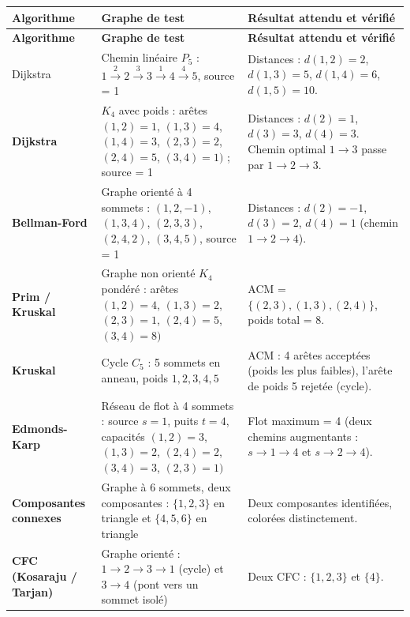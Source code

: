 \documentclass[a4paper,12pt]{report}
\begin{document}
\renewcommand{\arraystretch}{1.3}
\begin{longtable}{>{\bfseries}p{3.2cm} p{4.8cm} p{5.2cm}}
\rowcolor{headerblue}
\color{white}\textbf{Algorithme} & \color{white}\textbf{Graphe de test} & \color{white}\textbf{Résultat attendu et vérifié} \\
\hline
\endfirsthead
\rowcolor{headerblue}
\color{white}\textbf{Algorithme} & \color{white}\textbf{Graphe de test} & \color{white}\textbf{Résultat attendu et vérifié} \\
\hline
\endhead

\rowcolor{teal100}
Dijkstra &
Chemin linéaire $P_5$ : $1\xrightarrow{2}2\xrightarrow{3}3\xrightarrow{1}4\xrightarrow{4}5$, source = 1 &
Distances : $d(1,2)=2$, $d(1,3)=5$, $d(1,4)=6$, $d(1,5)=10$. \\

Dijkstra &
$K_4$ avec poids : arêtes $(1,2)=1$, $(1,3)=4$, $(1,4)=3$, $(2,3)=2$, $(2,4)=5$, $(3,4)=1)$ ; source = 1 &
Distances : $d(2)=1$, $d(3)=3$, $d(4)=3$. Chemin optimal $1\to3$ passe par $1\to2\to3$. \\

\rowcolor{teal100}
Bellman-Ford &
Graphe orienté à 4 sommets : $(1,2,-1)$, $(1,3,4)$, $(2,3,3)$, $(2,4,2)$, $(3,4,5)$, source = 1 &
Distances : $d(2)=-1$, $d(3)=2$, $d(4)=1$ (chemin $1\to2\to4$). \\

Prim / Kruskal &
Graphe non orienté $K_4$ pondéré : arêtes $(1,2)=4$, $(1,3)=2$, $(2,3)=1$, $(2,4)=5$, $(3,4)=8)$ &
ACM = $\{(2,3), (1,3), (2,4)\}$, poids total = 8. \\

\rowcolor{teal100}
Kruskal &
Cycle $C_5$ : 5 sommets en anneau, poids $1,2,3,4,5$ &
ACM : 4 arêtes acceptées (poids les plus faibles), l'arête de poids 5 rejetée (cycle). \\

Edmonds-Karp &
Réseau de flot à 4 sommets : source $s=1$, puits $t=4$, capacités $(1,2)=3$, $(1,3)=2$, $(2,4)=2$, $(3,4)=3$, $(2,3)=1)$ &
Flot maximum = 4 (deux chemins augmentants : $s\to1\to4$ et $s\to2\to4$). \\

\rowcolor{teal100}
Composantes connexes &
Graphe à 6 sommets, deux composantes : $\{1,2,3\}$ en triangle et $\{4,5,6\}$ en triangle &
Deux composantes identifiées, colorées distinctement. \\

CFC (Kosaraju / Tarjan) &
Graphe orienté : $1\to2\to3\to1$ (cycle) et $3\to4$ (pont vers un sommet isolé) &
Deux CFC : $\{1,2,3\}$ et $\{4\}$. \\


\end{longtable}
\end{document}
